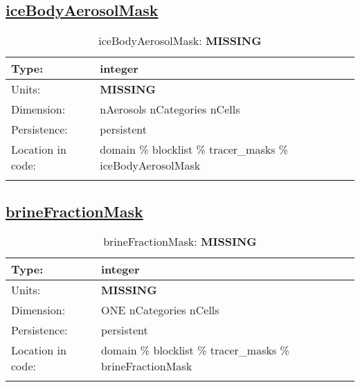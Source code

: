 \subsection[iceBodyAerosolMask]{\hyperref[sec:var_tab_tracer_masks]{iceBodyAerosolMask}}
\label{subsec:var_sec_tracer_masks_iceBodyAerosolMask}
\begin{center}
\begin{longtable}{| p{2.0in} | p{4.0in} |}
        \hline 
        Type: & integer \\
        \hline 
        Units: & {\bf \color{red} MISSING} \\
        \hline 
        Dimension: & nAerosols nCategories nCells \\
        \hline 
        Persistence: & persistent \\
        \hline 
         Location in code: & domain \% blocklist \% tracer\_masks \% iceBodyAerosolMask \\
         \hline 
    \caption{iceBodyAerosolMask: {\bf \color{red} MISSING}}
\end{longtable}
\end{center}
\subsection[brineFractionMask]{\hyperref[sec:var_tab_tracer_masks]{brineFractionMask}}
\label{subsec:var_sec_tracer_masks_brineFractionMask}
\begin{center}
\begin{longtable}{| p{2.0in} | p{4.0in} |}
        \hline 
        Type: & integer \\
        \hline 
        Units: & {\bf \color{red} MISSING} \\
        \hline 
        Dimension: & ONE nCategories nCells \\
        \hline 
        Persistence: & persistent \\
        \hline 
         Location in code: & domain \% blocklist \% tracer\_masks \% brineFractionMask \\
         \hline 
    \caption{brineFractionMask: {\bf \color{red} MISSING}}
\end{longtable}
\end{center}
